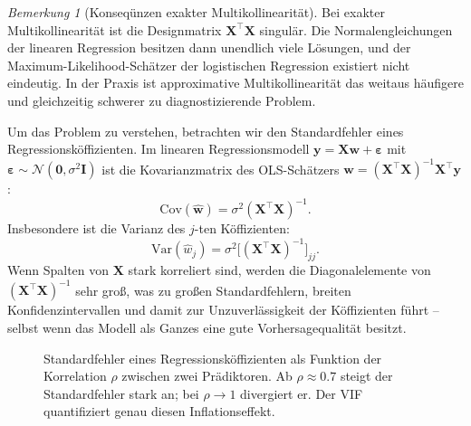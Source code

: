 ﻿\documentclass[12pt, a4paper]{article}
\theoremstyle{definition}
\theoremstyle{remark}
\newtheorem{remark}[theorem]{Bemerkung}
\newcommand{\vw}{\bm{w}}
\newcommand{\vy}{\bm{y}}
\newcommand{\vX}{\bm{X}}
\newcommand{\T}{\top}
\begin{document}
\begin{remark}[Konseqünzen exakter Multikollinearität]
	Bei exakter Multikollinearität ist die Designmatrix $\vX^\T\vX$ singulär. Die 
	Normalengleichungen der linearen Regression besitzen dann unendlich viele Lösungen, 
	und der Maximum-Likelihood-Schätzer der logistischen Regression existiert nicht eindeutig. 
	In der Praxis ist approximative Multikollinearität das weitaus häufigere und 
	gleichzeitig schwerer zu diagnostizierende Problem.
\end{remark}

Um das Problem zu verstehen, betrachten wir den Standardfehler eines Regressionsköffizienten.
Im linearen Regressionsmodell $\vy = \vX\vw + \bm{\varepsilon}$ mit $\bm{\varepsilon} \sim \mathcal{N}(\bm{0}, \sigma^2\mathbf{I})$
ist die Kovarianzmatrix des OLS-Schätzers $\hat{\vw} = (\vX^\T\vX)^{-1}\vX^\T\vy$:
\begin{equation}
	\mathrm{Cov}(\hat{\vw}) = \sigma^2 (\vX^\T\vX)^{-1}.
	\label{eq:cov_ols}
\end{equation}
Insbesondere ist die Varianz des $j$-ten Köffizienten:
\begin{equation}
	\mathrm{Var}(\hat{w}_j) = \sigma^2 \bigl[(\vX^\T\vX)^{-1}\bigr]_{jj}.
	\label{eq:var_cöff}
\end{equation}
Wenn Spalten von $\vX$ stark korreliert sind, werden die Diagonalelemente von $(\vX^\T\vX)^{-1}$
sehr groß, was zu großen Standardfehlern, breiten Konfidenzintervallen und damit zur
Unzuverlässigkeit der Köffizienten führt -- selbst wenn das Modell als Ganzes eine gute
Vorhersagequalität besitzt.

\begin{figure}[H]
	\centering
	\caption{Standardfehler eines Regressionsköffizienten als Funktion der Korrelation $\rho$ 
		zwischen zwei Prädiktoren. Ab $\rho \approx 0.7$ steigt der Standardfehler stark an; 
		bei $\rho \to 1$ divergiert er. Der VIF quantifiziert genau diesen Inflationseffekt.}
	\label{fig:vif_se}
\end{figure}
\end{document}
